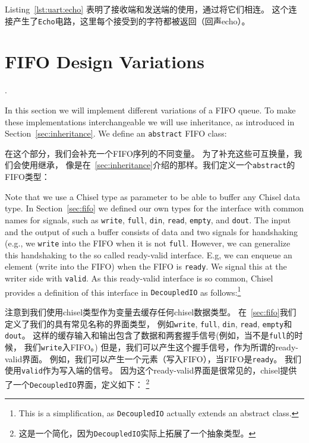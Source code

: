 \documentclass[%
    10pt,
    headinclude, footexclude,
    openright, %
    notitlepage,
    cleardoubleempty,
    headsepline,
    pointlessnumbers,
    bibtotoc, idxtotoc,
    ]{scrbook}
\newcommand{\code}[1]{{\small{\texttt{#1}}}}
\newcommand{\codefoot}[1]{{\footnotesize{\texttt{#1}}}}
\begin{document}
Listing~\ref{lst:uart:echo} 表明了接收端和发送端的使用，通过将它们相连。
这个连接产生了\code{Echo}电路，这里每个接受到的字符都被返回（回声echo）。

\section{FIFO Design Variations}
\label{sec:more:fifo}.

In this section we will implement different variations of a FIFO queue.
To make these implementations interchangeable we will use inheritance,
as introduced in Section~\ref{sec:inheritance}. We define an \code{abstract}
FIFO class:

在这个部分，我们会补充一个FIFO序列的不同变量。
为了补充这些可互换量，我们会使用继承，
像是在~\ref{sec:inheritance}介绍的那样。我们定义一个\code{abstract}的FIFO类型：


\noindent Note that we use a Chisel type as parameter to be able to buffer
any Chisel data type.
In Section~\ref{sec:fifo} we defined our own types for the interface with common
names for signals, such as \code{write}, \code{full}, \code{din}, \code{read},
\code{empty}, and \code{dout}. The input and the output of such a buffer consists
of data and two signals for handshaking (e.g., we \code{write} into the FIFO when
it is not \code{full}.
However, we can generalize this handshaking to the so called ready-valid interface.
E.g, we can enqueue an element (write into the FIFO) when the FIFO is \code{ready}.
We signal this at the writer side with \code{valid}.
As this ready-valid interface is so common, Chisel provides a definition
of this interface in \code{DecoupledIO} as follows:\footnote{This is a simplification,
as \codefoot{DecoupledIO} actually extends an abstract class.}

\noindent 注意到我们使用chisel类型作为变量去缓存任何chisel数据类型。
在~\ref{sec:fifo}我们定义了我们的具有常见名称的界面类型，
例如\code{write}, \code{full}, \code{din}, \code{read}, \code{empty}和\code{dout}。
这样的缓存输入和输出包含了数据和两套握手信号(例如，当不是\code{full}的时候， 我们\code{write}入FIFO。)
但是，我们可以产生这个握手信号，作为所谓的ready-valid界面。
例如，我们可以产生一个元素（写入FIFO），当FIFO是\code{ready}。
我们使用\code{valid}作为写入端的信号。
因为这个ready-valid界面是很常见的，chisel提供了一个\code{DecoupledIO}界面，定义如下：
\footnote{这是一个简化，因为\codefoot{DecoupledIO}实际上拓展了一个抽象类型。}
\end{document}
